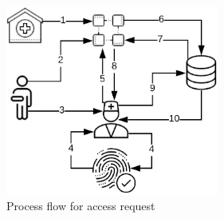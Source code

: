 \begin{figure}[H]
    \centering
    \includegraphics[width=70mm]{images/DataVault/blockchain.png}
    \caption{Process flow for access request}
    \label{fig:blockchain_flow}
\end{figure}
